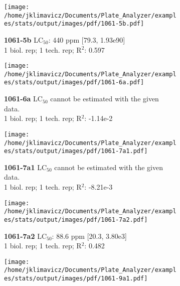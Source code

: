 \documentclass{article}
\begin{document}
\begin{figure}[thp!]
   \begin{subfigure}{0.500\textwidth}
      \centering
      \texttt{[image: /home/jklimavicz/Documents/Plate\_Analyzer/examples/stats/output/images/pdf/1061-5b.pdf]}
      \vspace{-0.05cm}
      \caption*{\textbf{1061-5b} LC$_{50}$: 440 ppm [79.3, 1.93e90] \\ 
1 biol. rep; 1 tech. rep; R$^2$: 0.597}
      \vspace{0.1cm}
   \end{subfigure}%
   \begin{subfigure}{0.500\textwidth}
      \centering
      \texttt{[image: /home/jklimavicz/Documents/Plate\_Analyzer/examples/stats/output/images/pdf/1061-6a.pdf]}
      \vspace{-0.05cm}
      \caption*{\textbf{1061-6a} LC$_{50}$ cannot be estimated with the given data. \\ 
1 biol. rep; 1 tech. rep; R$^2$: -1.14e-2}
      \vspace{0.1cm}
   \end{subfigure}%
\vspace{-0.1cm}
   \begin{subfigure}{0.500\textwidth}
      \centering
      \texttt{[image: /home/jklimavicz/Documents/Plate\_Analyzer/examples/stats/output/images/pdf/1061-7a1.pdf]}
      \vspace{-0.05cm}
      \caption*{\textbf{1061-7a1} LC$_{50}$ cannot be estimated with the given data. \\ 
1 biol. rep; 1 tech. rep; R$^2$: -8.21e-3}
      \vspace{0.1cm}
   \end{subfigure}%
   \begin{subfigure}{0.500\textwidth}
      \centering
      \texttt{[image: /home/jklimavicz/Documents/Plate\_Analyzer/examples/stats/output/images/pdf/1061-7a2.pdf]}
      \vspace{-0.05cm}
      \caption*{\textbf{1061-7a2} LC$_{50}$: 88.6 ppm [20.3, 3.80e3] \\ 
1 biol. rep; 1 tech. rep; R$^2$: 0.482}
      \vspace{0.1cm}
   \end{subfigure}%
\vspace{-0.1cm}
   \begin{subfigure}{0.500\textwidth}
      \centering
      \texttt{[image: /home/jklimavicz/Documents/Plate\_Analyzer/examples/stats/output/images/pdf/1061-9a1.pdf]}

\end{subfigure}
\end{figure}
\end{document}
